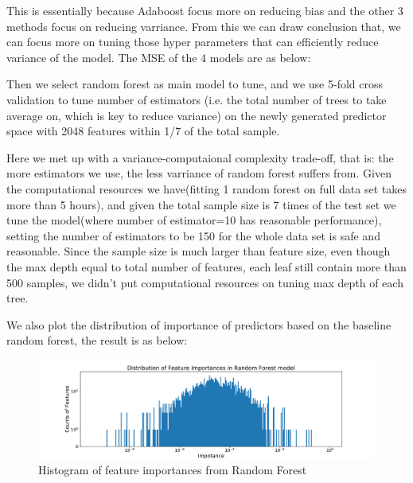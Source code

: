 \documentclass[11pt]{article}
\begin{document}
\begin{enumerate}
\begin{enumerate}
This is essentially because Adaboost focus more on reducing bias and the other 3 methods focus on reducing varriance. From this we can draw conclusion that, we can focus more on tuning those hyper parameters that can efficiently reduce variance of the model. The MSE of the 4 models are as below: 




Then we select random forest as main model to tune, and we use 5-fold cross validation to tune number of estimators (i.e. the total number of trees to take average on, which is key to reduce variance) on the newly generated predictor space with 2048 features within 1/7 of the total sample. 

Here we met up with a variance-computaional complexity trade-off, that is: the more estimators we use, the less varriance of random forest suffers from. Given the computational resources we have(fitting 1 random forest on full data set takes more than 5 hours), and given the total sample size is 7 times of the test set we tune the model(where number of estimator=10 has reasonable performance), setting the number of estimators to be 150 for the whole data set is safe and reasonable. 
Since the sample size is much larger than feature size, even though the max depth equal to total number of features, each leaf still contain more than 500 samples, we didn't put computational resources on tuning max depth of each tree.

We also plot the distribution of importance of predictors based on the baseline random forest, the result is as below:

\begin{figure}[h]
\centering
\includegraphics[width=\textwidth]{his_feature_importance}
\caption{Histogram of feature importances from Random Forest}
\label{fig:his_feature_importance}
\end{figure}


\end{enumerate}
\end{enumerate}
\end{document}

